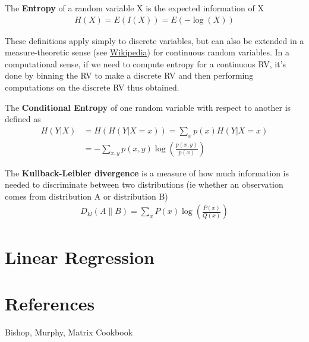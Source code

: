 \documentclass[a4paper]{article}
\newcommand{\nl}{\vspace{0.2cm}\\}
\begin{document}
\begin{defn}
  The \textbf{Entropy} of a random variable X is the expected information of X
  \begin{align}
    H(X) = E(I(X)) = E(-\log(X))
  \end{align}
\end{defn}

These definitions apply simply to discrete variables, but can also be extended in a measure-theoretic sense (see \href{https://en.wikipedia.org/wiki/Entropy_(information_theory)#Measure_theory}{Wikipedia}) for continuous random variables. In a computational sense, if we need to compute entropy for a continuous RV, it's done by binning the RV to make a discrete RV and then performing computations on the discrete RV thus obtained. \nl

\begin{defn}
  The \textbf{Conditional Entropy} of one random variable with respect to another is defined as
  \begin{align}
    H(Y|X) &= H(H(Y|X=x)) = \sum_x p(x) H(Y|X=x) \\
    &= - \sum_{x,y} p(x,y) \log\left( \frac{p(x,y)}{p(x)} \right) \nonumber
  \end{align}
\end{defn}

\begin{defn}
  The \textbf{Kullback-Leibler divergence} is a measure of how much information is needed to discriminate between two distributions (ie whether an observation comes from distribution A or distribution B)
  \begin{align}
    D_{kl}(A \parallel B) = \sum_x P(x) \log \left( \frac{P(x)}{Q(x)} \right)
  \end{align}
\end{defn}

\section{Linear Regression}

\section{References}
Bishop, Murphy, Matrix Cookbook
\end{document}
